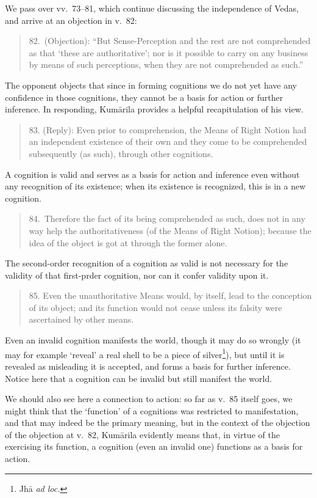 \documentclass[11pt,letterpaper,oneside]{amsart}
\newenvironment{squote}{\begin{quote}\sf\small}{\rm\end{quote}} %
\begin{document}
We pass over vv.\ 73--81, which continue discussing the independence of Vedas, and arrive at an objection in v.\ 82:\begin{squote}82.\ (Objection): ``But Sense-Perception and the rest are not comprehended as that `these are authoritative'; nor is it possible to carry on any business by means of such perceptions, when they are not comprehended as such.''\end{squote} The opponent objects that since in forming cognitions we do not yet have any confidence in those cognitions, they cannot be a basis for action or further inference. In responding, Kum\=arila provides a helpful recapitulation of his view.\begin{squote} 83. (Reply): Even prior to comprehension, the Means of Right Notion had an independent existence of their own and they come to be comprehended subsequently (as such), through other cognitions.\end{squote} A cognition is valid and serves as a basis for action and inference even without any recognition of its existence; when its existence is recognized, this is in a new cognition.\begin{squote} 84.\ Therefore the fact of its being comprehended as such, does not in any way help the authoritativeness (of the Means of Right Notion); because the idea of the object is got at through the former alone.\end{squote} The second-order recognition of a cognition as valid is not necessary for the validity of that first-prder cognition, nor can it confer validity upon it.\begin{squote}85. Even the unauthoritative Means would, by itself, lead to the conception of its object; and its function would not cease unless its falsity were ascertained by other means.\end{squote} Even an invalid cognition manifests the world, though it may do so wrongly (it may for example `reveal' a real shell to be a piece of silver\footnote{Jh\=a \emph{ad loc.}}), but until it is revealed as misleading it is accepted, and forms a basis for further inference. Notice here that a cognition can be invalid but still manifest the world.%

We should also see here a connection to action: so far as v.\ 85 itself goes, we might think that the `function' of a cognitions was restricted to manifestation, and that may indeed be the primary meaning, but in the context of the objection of the objection at v.\ 82, Kum\=arila evidently means that, in virtue of the exercising its function, a cognition (even an invalid one) functions as a basis for action.
\end{document}
